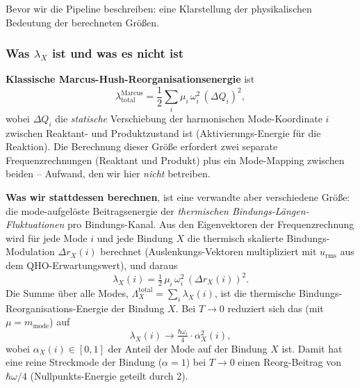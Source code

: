 \documentclass[11pt,a4paper,twoside]{article}
\theoremstyle{remark}
\begin{document}
Bevor wir die Pipeline beschreiben: eine Klarstellung der
physikalischen Bedeutung der berechneten Gr\"o{\ss}en.

\subsubsection*{Was $\lambda_X$ ist und was es nicht ist}

\textbf{Klassische Marcus-Hush-Reorganisationsenergie}
\cite{Marcus1956,Marcus1993} ist
\begin{equation}
  \lambda^{\text{Marcus}}_\text{total}
  = \frac{1}{2}\sum_i \mu_i\,\omega_i^2\,(\Delta Q_i)^2,
  \label{eq:marcus-hush}
\end{equation}
wobei $\Delta Q_i$ die \emph{statische} Verschiebung der harmonischen
Mode-Koordinate $i$ zwischen Reaktant- und Produktzustand ist
(Aktivierungs-Energie f\"ur die Reaktion). Die Berechnung dieser Gr\"o{\ss}e
erfordert zwei separate Frequenzrechnungen (Reaktant und Produkt) plus
ein Mode-Mapping zwischen beiden -- Aufwand, den wir hier
\emph{nicht} betreiben.

\textbf{Was wir stattdessen berechnen}, ist eine verwandte aber
verschiedene Gr\"o{\ss}e: die mode-aufgel\"oste Beitragsenergie der
\emph{thermischen Bindungs-L\"angen-Fluktuationen} pro Bindungs-Kanal.
Aus den Eigenvektoren der Frequenzrechnung wird f\"ur jede Mode $i$
und jede Bindung $X$ die thermisch skalierte Bindungs-Modulation
$\Delta r_X(i)$ berechnet (Auslenkungs-Vektoren multipliziert mit
$u_\text{rms}$ aus dem QHO-Erwartungswert), und daraus
\begin{equation}
  \lambda_X(i) = \tfrac{1}{2}\,\mu_i\,\omega_i^2\,(\Delta r_X(i))^2.
  \label{eq:lambda-mode}
\end{equation}
Die Summe \"uber alle Modes,
$\Lambda_X^\text{total} = \sum_i \lambda_X(i)$, ist die thermische
Bindungs-Reorganisations-Energie der Bindung $X$. Bei $T \to 0$
reduziert sich das (mit $\mu = m_\text{mode}$) auf
\begin{equation}
  \lambda_X(i) \to \tfrac{\hbar\omega_i}{4} \cdot \alpha_X^2(i),
\end{equation}
wobei $\alpha_X(i) \in [0, 1]$ der Anteil der Mode auf der Bindung $X$
ist. Damit hat eine reine Streckmode der Bindung ($\alpha = 1$) bei
$T \to 0$ einen Reorg-Beitrag von $\hbar\omega/4$ (Nullpunkts-Energie
geteilt durch 2).
\end{document}

